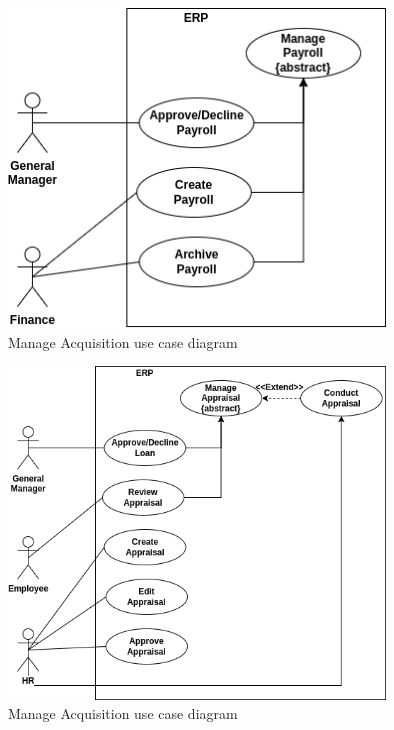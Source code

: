 \begin{figure}[!ht]
\centering
\includegraphics[width=10cm,keepaspectratio]{usecases/payroll.drawio.png}
\caption{Manage Acquisition use case diagram }
\end{figure}


\begin{figure}[!ht]
\centering
\includegraphics[width=10cm,keepaspectratio]{usecases/appraisal.drawio.png}
\caption{Manage Acquisition use case diagram }
\end{figure}

